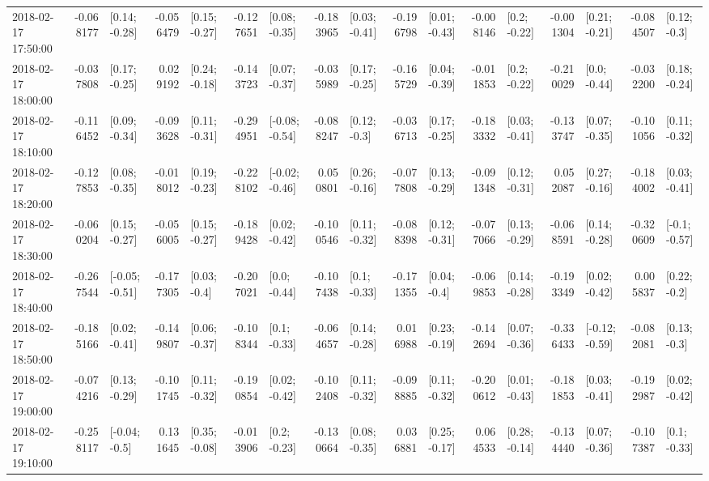 \begin{tabular}{lrlrlrlrlrlrlrlrl}
2018-02-17 17:50:00 & -0.068177 &   [0.14; -0.28] & -0.056479 &   [0.15; -0.27] & -0.127651 &   [0.08; -0.35] & -0.183965 &   [0.03; -0.41] & -0.196798 &   [0.01; -0.43] & -0.008146 &    [0.2; -0.22] & -0.001304 &   [0.21; -0.21] & -0.084507 &    [0.12; -0.3] \\
2018-02-17 18:00:00 & -0.037808 &   [0.17; -0.25] &  0.029192 &   [0.24; -0.18] & -0.143723 &   [0.07; -0.37] & -0.035989 &   [0.17; -0.25] & -0.165729 &   [0.04; -0.39] & -0.011853 &    [0.2; -0.22] & -0.210029 &    [0.0; -0.44] & -0.032200 &   [0.18; -0.24] \\
2018-02-17 18:10:00 & -0.116452 &   [0.09; -0.34] & -0.093628 &   [0.11; -0.31] & -0.294951 &  [-0.08; -0.54] & -0.088247 &    [0.12; -0.3] & -0.036713 &   [0.17; -0.25] & -0.183332 &   [0.03; -0.41] & -0.133747 &   [0.07; -0.35] & -0.101056 &   [0.11; -0.32] \\
2018-02-17 18:20:00 & -0.127853 &   [0.08; -0.35] & -0.018012 &   [0.19; -0.23] & -0.228102 &  [-0.02; -0.46] &  0.050801 &   [0.26; -0.16] & -0.077808 &   [0.13; -0.29] & -0.091348 &   [0.12; -0.31] &  0.052087 &   [0.27; -0.16] & -0.184002 &   [0.03; -0.41] \\
2018-02-17 18:30:00 & -0.060204 &   [0.15; -0.27] & -0.056005 &   [0.15; -0.27] & -0.189428 &   [0.02; -0.42] & -0.100546 &   [0.11; -0.32] & -0.088398 &   [0.12; -0.31] & -0.077066 &   [0.13; -0.29] & -0.068591 &   [0.14; -0.28] & -0.320609 &   [-0.1; -0.57] \\
2018-02-17 18:40:00 & -0.267544 &  [-0.05; -0.51] & -0.177305 &    [0.03; -0.4] & -0.207021 &    [0.0; -0.44] & -0.107438 &    [0.1; -0.33] & -0.171355 &    [0.04; -0.4] & -0.069853 &   [0.14; -0.28] & -0.193349 &   [0.02; -0.42] &  0.005837 &    [0.22; -0.2] \\
2018-02-17 18:50:00 & -0.185166 &   [0.02; -0.41] & -0.149807 &   [0.06; -0.37] & -0.108344 &    [0.1; -0.33] & -0.064657 &   [0.14; -0.28] &  0.016988 &   [0.23; -0.19] & -0.142694 &   [0.07; -0.36] & -0.336433 &  [-0.12; -0.59] & -0.082081 &    [0.13; -0.3] \\
2018-02-17 19:00:00 & -0.074216 &   [0.13; -0.29] & -0.101745 &   [0.11; -0.32] & -0.190854 &   [0.02; -0.42] & -0.102408 &   [0.11; -0.32] & -0.098885 &   [0.11; -0.32] & -0.200612 &   [0.01; -0.43] & -0.181853 &   [0.03; -0.41] & -0.192987 &   [0.02; -0.42] \\
2018-02-17 19:10:00 & -0.258117 &   [-0.04; -0.5] &  0.131645 &   [0.35; -0.08] & -0.013906 &    [0.2; -0.23] & -0.130664 &   [0.08; -0.35] &  0.036881 &   [0.25; -0.17] &  0.064533 &   [0.28; -0.14] & -0.134440 &   [0.07; -0.36] & -0.107387 &    [0.1; -0.33] \\

\end{tabular}
